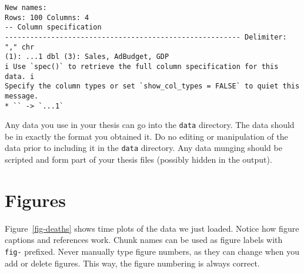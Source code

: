 \documentclass{uniexeterthesis}
\begin{document}
\begin{Shaded}
\begin{Highlighting}[]
\OtherTok{\textless{}{-}}\SpecialCharTok{::}\SpecialCharTok{::}\NormalTok{(}\NormalTok{)) }\SpecialCharTok{\%\textgreater{}\%}
  \NormalTok{(} \StringTok{\textasciigrave{}}\StringTok{\textasciigrave{}}\NormalTok{) }\SpecialCharTok{\%\textgreater{}\%}
  \NormalTok{(}
     \NormalTok{(}\NormalTok{(}\NormalTok{),}
     
\NormalTok{  ) }\SpecialCharTok{\%\textgreater{}\%}
  \NormalTok{(}
\end{Highlighting}
\end{Shaded}

\begin{verbatim}
New names:
Rows: 100 Columns: 4
-- Column specification
-------------------------------------------------------- Delimiter: "," chr
(1): ...1 dbl (3): Sales, AdBudget, GDP
i Use `spec()` to retrieve the full column specification for this data. i
Specify the column types or set `show_col_types = FALSE` to quiet this message.
* `` -> `...1`
\end{verbatim}

Any data you use in your thesis can go into the \texttt{data} directory.
The data should be in exactly the format you obtained it. Do no editing
or manipulation of the data prior to including it in the \texttt{data}
directory. Any data munging should be scripted and form part of your
thesis files (possibly hidden in the output).

\hypertarget{figures}{%
\section{Figures}\label{figures}}

Figure~\ref{fig-deaths} shows time plots of the data we just loaded.
Notice how figure captions and references work. Chunk names can be used
as figure labels with \texttt{fig-} prefixed. Never manually type figure
numbers, as they can change when you add or delete figures. This way,
the figure numbering is always correct.
\end{document}
